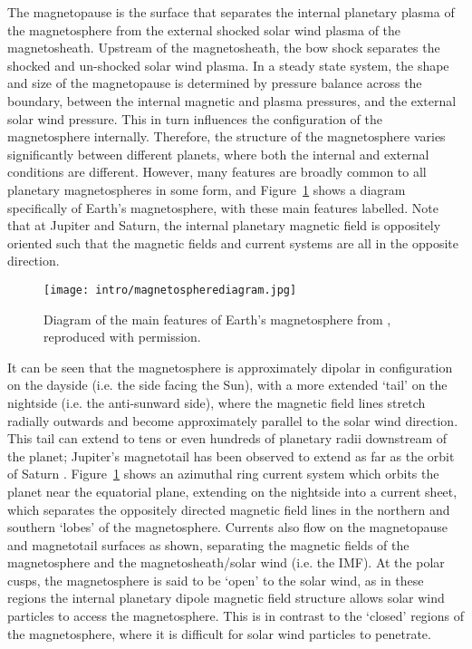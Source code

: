 {The magnetopause is the surface that separates the internal planetary plasma of the magnetosphere from the external shocked solar wind plasma of the magnetosheath. Upstream of the magnetosheath, the bow shock separates the shocked and un-shocked solar wind plasma. In a steady state system, the shape and size of the magnetopause is determined by pressure balance across the boundary, between the internal magnetic and plasma pressures, and the external solar wind pressure. This in turn influences the configuration of the magnetosphere internally. Therefore, the structure of the magnetosphere varies significantly between different planets, where both the internal and external conditions are different. However, many features are broadly common to all planetary magnetospheres in some form, and Figure~\ref{intro:fig:magnetosphere} shows a diagram specifically of Earth's magnetosphere, with these main features labelled. Note that at Jupiter and Saturn, the internal planetary magnetic field is oppositely oriented such that the magnetic fields and current systems are all in the opposite direction.

\begin{figure}
\centering
\noindent\texttt{[image: intro/magnetospherediagram.jpg]}
\caption[Diagram of Earth's magnetosphere.]{Diagram of the main features of Earth's magnetosphere from \citet{russell2016}, reproduced with permission.}
\label{intro:fig:magnetosphere}
\end{figure}

It can be seen that the magnetosphere is approximately dipolar in configuration on the dayside (i.e. the side facing the Sun), with a more extended `tail' on the nightside (i.e. the anti-sunward side), where the magnetic field lines stretch radially outwards and become approximately parallel to the solar wind direction. This tail can extend to tens or even hundreds of planetary radii downstream of the planet; Jupiter's magnetotail has been observed to extend as far as the orbit of Saturn \citep{scarf1981}. Figure~\ref{intro:fig:magnetosphere} shows an azimuthal ring current system which orbits the planet near the equatorial plane, extending on the nightside into a current sheet, which separates the oppositely directed magnetic field lines in the northern and southern `lobes' of the magnetosphere. Currents also flow on the magnetopause and magnetotail surfaces as shown, separating the magnetic fields of the magnetosphere and the magnetosheath/solar wind (i.e. the IMF). At the polar cusps, the magnetosphere is said to be `open' to the solar wind, as in these regions the internal planetary dipole magnetic field structure allows solar wind particles to access the magnetosphere. This is in contrast to the `closed' regions of the magnetosphere, where it is difficult for solar wind particles to penetrate.

}
